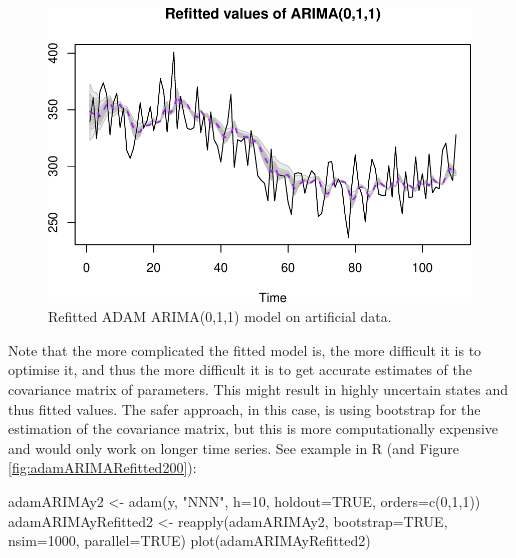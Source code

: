 \documentclass[
]{book}
\newenvironment{Shaded}{\begin{snugshade}}{\end{snugshade}}
\newcommand{\AttributeTok}[1]{\textcolor[rgb]{0.77,0.63,0.00}{#1}}
\newcommand{\ConstantTok}[1]{\textcolor[rgb]{0.00,0.00,0.00}{#1}}
\newcommand{\DecValTok}[1]{\textcolor[rgb]{0.00,0.00,0.81}{#1}}
\newcommand{\FunctionTok}[1]{\textcolor[rgb]{0.00,0.00,0.00}{#1}}
\newcommand{\NormalTok}[1]{#1}
\newcommand{\OtherTok}[1]{\textcolor[rgb]{0.56,0.35,0.01}{#1}}
\newcommand{\StringTok}[1]{\textcolor[rgb]{0.31,0.60,0.02}{#1}}
\theoremstyle{definition}
\theoremstyle{definition}
\theoremstyle{definition}
\theoremstyle{definition}
\theoremstyle{remark}
\begin{document}
\begin{figure}
\centering
\includegraphics{Svetunkov--2022----ADAM_files/figure-latex/adamARIMARefitted-1.pdf}
\caption{\label{fig:adamARIMARefitted}Refitted ADAM ARIMA(0,1,1) model on artificial data.}
\end{figure}

Note that the more complicated the fitted model is, the more difficult it is to optimise it, and thus the more difficult it is to get accurate estimates of the covariance matrix of parameters. This might result in highly uncertain states and thus fitted values. The safer approach, in this case, is using bootstrap for the estimation of the covariance matrix, but this is more computationally expensive and would only work on longer time series. See example in R (and Figure \ref{fig:adamARIMARefitted200}):

\begin{Shaded}
\begin{Highlighting}[]
\NormalTok{adamARIMAy2 }\OtherTok{\textless{}{-}} \FunctionTok{adam}\NormalTok{(y, }\StringTok{"NNN"}\NormalTok{, }\AttributeTok{h=}\DecValTok{10}\NormalTok{, }\AttributeTok{holdout=}\ConstantTok{TRUE}\NormalTok{,}
                    \AttributeTok{orders=}\FunctionTok{c}\NormalTok{(}\DecValTok{0}\NormalTok{,}\DecValTok{1}\NormalTok{,}\DecValTok{1}\NormalTok{))}
\NormalTok{adamARIMAyRefitted2 }\OtherTok{\textless{}{-}} \FunctionTok{reapply}\NormalTok{(adamARIMAy2, }\AttributeTok{bootstrap=}\ConstantTok{TRUE}\NormalTok{,}
                               \AttributeTok{nsim=}\DecValTok{1000}\NormalTok{, }\AttributeTok{parallel=}\ConstantTok{TRUE}\NormalTok{)}
\FunctionTok{plot}\NormalTok{(adamARIMAyRefitted2)}
\end{Highlighting}
\end{Shaded}
\end{document}
